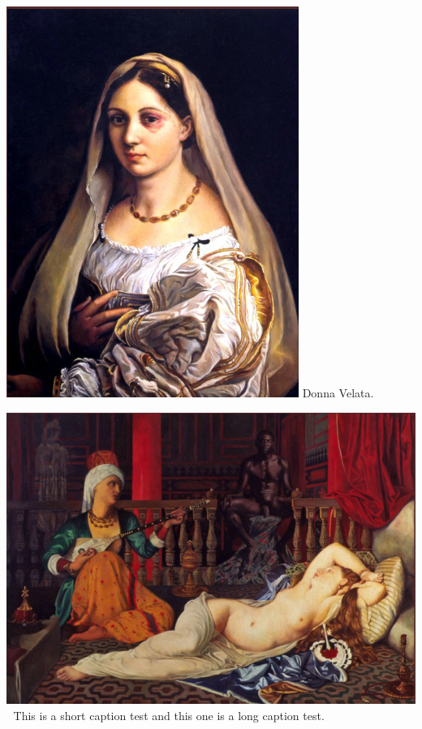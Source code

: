\includegraphics[width=\textheight, width=\textwidth]{./images/woman.png}
Donna Velata.

\clearpage
\raggedbottom


\noindent\includegraphics[width=\textwidth]{./images/odalisque.png}^^A
This is a short caption test and this one is a long caption test.
\vspace*{2\baselineskip}


